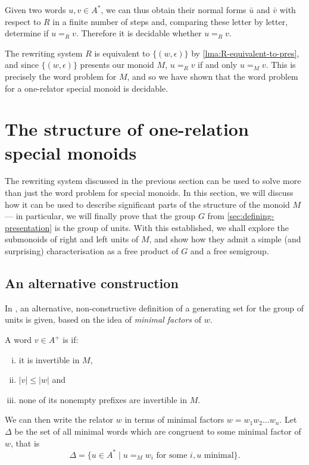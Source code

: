 \documentclass[noindex,noinsetproof,12pt]{lmaths}
\begin{document}
Given two words $u, v \in A^*$, we can thus obtain their normal forms $\bar u$ and $\bar v$ with respect to $R$ in a finite number of steps and, comparing these letter by letter, determine if $u =_R v$. Therefore it is decidable whether $u =_R v$.

The rewriting system $R$ is equivalent to $\{(w, \epsilon)\}$ by \cref{lma:R-equivalent-to-pres}, and since $\{(w, \epsilon)\}$ presents our monoid $M$, $u =_R v$ if and only $u =_M v$. This is precisely the word problem for $M$, and so we have shown that the word problem for a one-relator special monoid is decidable.


\section{The structure of one-relation special monoids} \label{sec:structure}

The rewriting system discussed in the previous section can be used to solve more than just the word problem for special monoids. In this section, we will discuss how it can be used to describe significant parts of the structure of the monoid $M$ --- in particular, we will finally prove that the group $G$ from \cref{sec:defining-presentation} is the group of units. With this established, we shall explore the submonoids of right and left units of $M$, and show how they admit a simple (and surprising) characterisation as a free product of $G$ and a free semigroup.

\subsection{An alternative construction}

In \cite{Zhang1992}, an alternative, non-constructive definition of a generating set for the group of units is given, based on the idea of \emph{minimal factors} of $w$.

\begin{defn}
	A word $v \in A^+$ is  if:
	\begin{enumerate}[(i)]
		\item it is invertible in $M$,
		\item $|v| \le |w|$ and
		\item none of its nonempty prefixes are invertible in $M$.
	\end{enumerate}
\end{defn}

We can then write the relator $w$ in terms of minimal factors $w = w_1w_2\ldots w_n$. Let $\Delta$ be the set of all minimal words which are congruent to some minimal factor of $w$, that is
	\[ \Delta = \{ u \in A^* \mid u =_M w_i \text{ for some } i, u\text{ minimal} \}. \]
\end{document}
